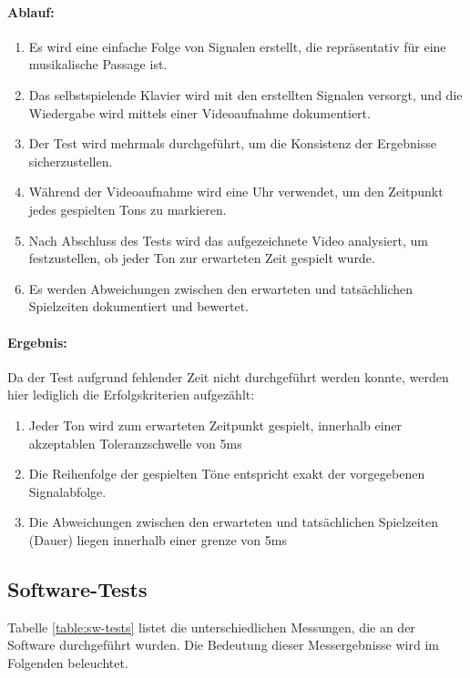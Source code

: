 \paragraph{Ablauf:}
\begin{enumerate}
	\item Es wird eine einfache Folge von Signalen erstellt, die repräsentativ für eine musikalische Passage ist.
	\item Das selbstspielende Klavier wird mit den erstellten Signalen versorgt, und die Wiedergabe wird mittels einer Videoaufnahme dokumentiert.
	\item Der Test wird mehrmals durchgeführt, um die Konsistenz der Ergebnisse sicherzustellen.
	\item Während der Videoaufnahme wird eine Uhr verwendet, um den Zeitpunkt jedes gespielten Tons zu markieren.
	\item Nach Abschluss des Tests wird das aufgezeichnete Video analysiert, um festzustellen, ob jeder Ton zur erwarteten Zeit gespielt wurde.
	\item Es werden Abweichungen zwischen den erwarteten und tatsächlichen Spielzeiten dokumentiert und bewertet.
\end{enumerate}

\paragraph{Ergebnis:}
Da der Test aufgrund fehlender Zeit nicht durchgeführt werden konnte, werden hier lediglich die Erfolgskriterien aufgezählt:
\begin{enumerate}
	\item Jeder Ton wird zum erwarteten Zeitpunkt gespielt, innerhalb einer akzeptablen Toleranzschwelle von 5ms
	\item Die Reihenfolge der gespielten Töne entspricht exakt der vorgegebenen Signalabfolge.
	\item Die Abweichungen zwischen den erwarteten und tatsächlichen Spielzeiten (Dauer) liegen innerhalb einer grenze von 5ms
\end{enumerate}

\subsection{Software-Tests} \label{tests-sw}

Tabelle \ref{table:sw-tests} listet die unterschiedlichen Messungen, die an der Software durchgeführt wurden.
Die Bedeutung dieser Messergebnisse wird im Folgenden beleuchtet.

